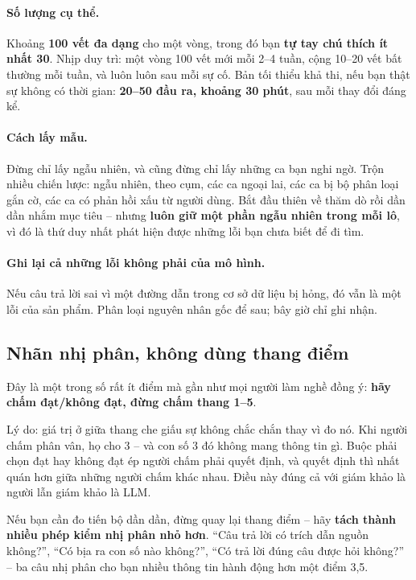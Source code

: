 \paragraph{Số lượng cụ thể.} Khoảng \textbf{100 vết đa dạng} cho một vòng, trong đó bạn \textbf{tự tay chú thích ít nhất 30}. Nhịp duy trì: một vòng 100 vết mới mỗi 2--4 tuần, cộng 10--20 vết bất thường mỗi tuần, và luôn luôn sau mỗi sự cố. Bản tối thiểu khả thi, nếu bạn thật sự không có thời gian: \textbf{20--50 đầu ra, khoảng 30 phút}, sau mỗi thay đổi đáng kể.

\paragraph{Cách lấy mẫu.} Đừng chỉ lấy ngẫu nhiên, và cũng đừng chỉ lấy những ca bạn nghi ngờ. Trộn nhiều chiến lược: ngẫu nhiên, theo cụm, các ca ngoại lai, các ca bị bộ phân loại gắn cờ, các ca có phản hồi xấu từ người dùng. Bắt đầu thiên về thăm dò rồi dần dần nhắm mục tiêu -- nhưng \textbf{luôn giữ một phần ngẫu nhiên trong mỗi lô}, vì đó là thứ duy nhất phát hiện được những lỗi bạn chưa biết để đi tìm.

\paragraph{Ghi lại cả những lỗi không phải của mô hình.} Nếu câu trả lời sai vì một đường dẫn trong cơ sở dữ liệu bị hỏng, đó vẫn là một lỗi của sản phẩm. Phân loại nguyên nhân gốc để sau; bây giờ chỉ ghi nhận.

\subsection{Nhãn nhị phân, không dùng thang điểm}
\label{ssec:binary_labels}

Đây là một trong số rất ít điểm mà gần như mọi người làm nghề đồng ý: \textbf{hãy chấm đạt/không đạt, đừng chấm thang 1--5}.

Lý do: giá trị ở giữa thang che giấu sự không chắc chắn thay vì đo nó. Khi người chấm phân vân, họ cho 3 -- và con số 3 đó không mang thông tin gì. Buộc phải chọn đạt hay không đạt ép người chấm phải quyết định, và quyết định thì nhất quán hơn giữa những người chấm khác nhau. Điều này đúng cả với giám khảo là người lẫn giám khảo là LLM.

Nếu bạn cần đo tiến bộ dần dần, đừng quay lại thang điểm -- hãy \textbf{tách thành nhiều phép kiểm nhị phân nhỏ hơn}. “Câu trả lời có trích dẫn nguồn không?”, “Có bịa ra con số nào không?”, “Có trả lời đúng câu được hỏi không?” -- ba câu nhị phân cho bạn nhiều thông tin hành động hơn một điểm 3{,}5.

